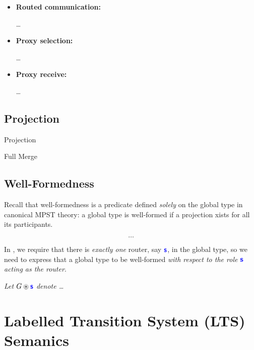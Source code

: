 \begin{itemize}

\item \textbf{Routed communication:}

\dots

\item \textbf{Proxy selection:}

\dots

\item \textbf{Proxy receive:}

\dots

\end{itemize}



\subsection{Projection}
\label{subsection:newprojection}

Projection

Full Merge


\subsection{Well-Formedness}
Recall that well-formedness is a predicate defined 
\textit{solely} on the global type
in canonical MPST theory: a global type is well-formed 
if a projection xists for all its participants.

\[
\dots
\]

In \newtheory, we require that there is \textit{exactly
one} router, say ${\color{blue}\bm{\mathsf{s}}}$, in the global type, so
we need to express that a global type to be
well-formed \textit{with respect to the role ${\color{blue}\bm{\mathsf{s}}}$
acting as the router}.





\begin{definition}[Centroid]
\textit{Let} ${G} \circledast {\color{blue}\bm{\mathsf{s}}}$ \textit{denote \dots}

\end{definition}


\section{Labelled Transition System (LTS) Semanics}
\label{section:lts}

